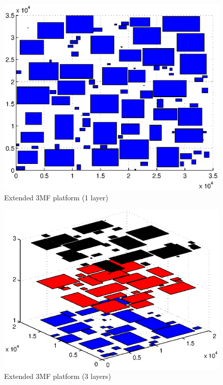 \begin{figure}[h!]
\begin{center}
\includegraphics[width=\textwidth]{valid1lmandist.eps}
\caption{Extended 3MF platform (1 layer)}
\label{fig:valid1lmandist}
\end{center}
\end{figure}

\begin{figure}[h!]
\begin{center}
\includegraphics[width=\textwidth]{valid3lmandist.eps}
\caption{Extended 3MF platform (3 layers)}
\label{fig:valid3lmandist}
\end{center}
\end{figure}

